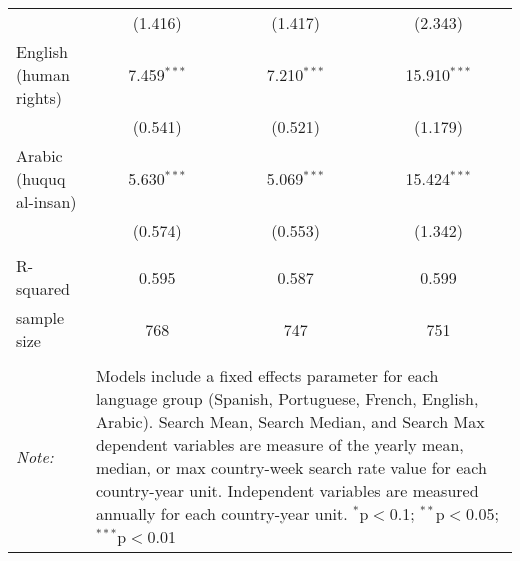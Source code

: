 \begin{table}[!htbp]
\begin{tabular}{@{\extracolsep{5pt}}lccc}
  & (1.416) & (1.417) & (2.343) \\ 
  English (human rights) & 7.459$^{***}$ & 7.210$^{***}$ & 15.910$^{***}$ \\ 
  & (0.541) & (0.521) & (1.179) \\ 
  Arabic (huquq al-insan) & 5.630$^{***}$ & 5.069$^{***}$ & 15.424$^{***}$ \\ 
  & (0.574) & (0.553) & (1.342) \\ 
 \hline \\[-1.8ex] 
R-squared  & 0.595 & 0.587 & 0.599 \\ 
sample size  & 768 & 747 & 751 \\ 
\hline 
\hline \\[-1.8ex] 
\textit{Note:}  & \multicolumn{3}{l}{\parbox[t]{8cm}{Models include a fixed effects parameter for each language group (Spanish, Portuguese, French, English, Arabic). Search Mean, Search Median, and Search Max dependent variables are measure of the yearly mean, median, or max country-week search rate value for each country-year unit. Independent variables are measured annually for each country-year unit. $^{*}$p$<$0.1; $^{**}$p$<$0.05; $^{***}$p$<$0.01}} \\ 
\end{tabular} 
\end{table} 
